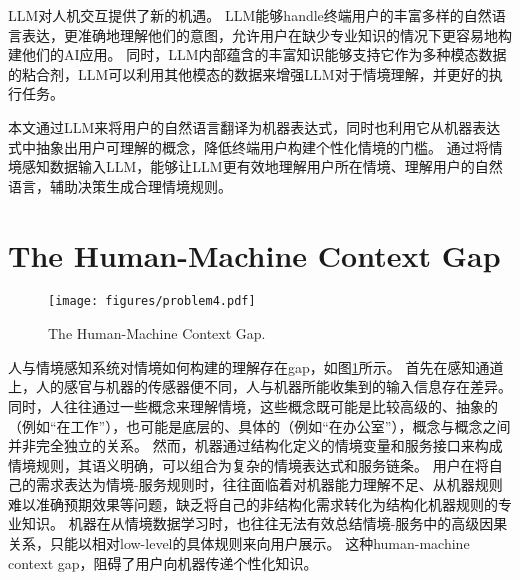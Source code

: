 LLM对人机交互提供了新的机遇\cite{bommasani_opportunities_2022}。
LLM能够handle终端用户的丰富多样的自然语言表达，更准确地理解他们的意图，允许用户在缺少专业知识的情况下更容易地构建他们的AI应用。
同时，LLM内部蕴含的丰富知识能够支持它作为多种模态数据的粘合剂，LLM可以利用其他模态的数据来增强LLM对于情境理解，并更好的执行任务\cite{mialon_augmented_2023}。

本文通过LLM来将用户的自然语言翻译为机器表达式，同时也利用它从机器表达式中抽象出用户可理解的概念，降低终端用户构建个性化情境的门槛。
通过将情境感知数据输入LLM，能够让LLM更有效地理解用户所在情境、理解用户的自然语言，辅助决策生成合理情境规则。


\section{The Human-Machine Context Gap}

\begin{figure}[h]
    \centering
    \texttt{[image: figures/problem4.pdf]}
    \caption{The Human-Machine Context Gap.}
    \label{fig:problem}
\end{figure}

人与情境感知系统对情境如何构建的理解存在gap，如图\ref{fig:problem}所示。
首先在感知通道上，人的感官与机器的传感器便不同，人与机器所能收集到的输入信息存在差异。
同时，人往往通过一些概念来理解情境，这些概念既可能是比较高级的、抽象的（例如“在工作”），也可能是底层的、具体的（例如“在办公室”），概念与概念之间并非完全独立的关系。
然而，机器通过结构化定义的情境变量和服务接口来构成情境规则，其语义明确，可以组合为复杂的情境表达式和服务链条。
用户在将自己的需求表达为情境-服务规则时，往往面临着对机器能力理解不足、从机器规则难以准确预期效果等问题，缺乏将自己的非结构化需求转化为结构化机器规则的专业知识。
机器在从情境数据学习时，也往往无法有效总结情境-服务中的高级因果关系，只能以相对low-level的具体规则来向用户展示。
这种human-machine context gap，阻碍了用户向机器传递个性化知识。


